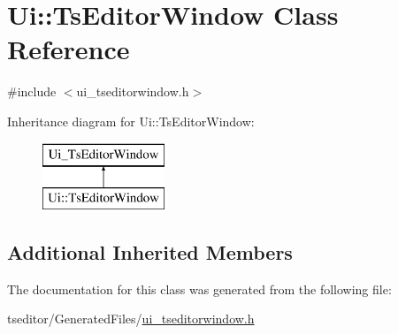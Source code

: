 \hypertarget{class_ui_1_1_ts_editor_window}{}\section{Ui\+::Ts\+Editor\+Window Class Reference}
\label{class_ui_1_1_ts_editor_window}


{\ttfamily \#include $<$ui\+\_\+tseditorwindow.\+h$>$}

Inheritance diagram for Ui\+::Ts\+Editor\+Window\+:\begin{figure}[H]
\begin{center}
\leavevmode
\includegraphics[height=2.000000cm]{d9/d89/class_ui_1_1_ts_editor_window}
\end{center}
\end{figure}
\subsection*{Additional Inherited Members}


The documentation for this class was generated from the following file\+:\begin{DoxyCompactItemize}
\item 
tseditor/\+Generated\+Files/\mbox{\hyperlink{ui__tseditorwindow_8h}{ui\+\_\+tseditorwindow.\+h}}\end{DoxyCompactItemize}
